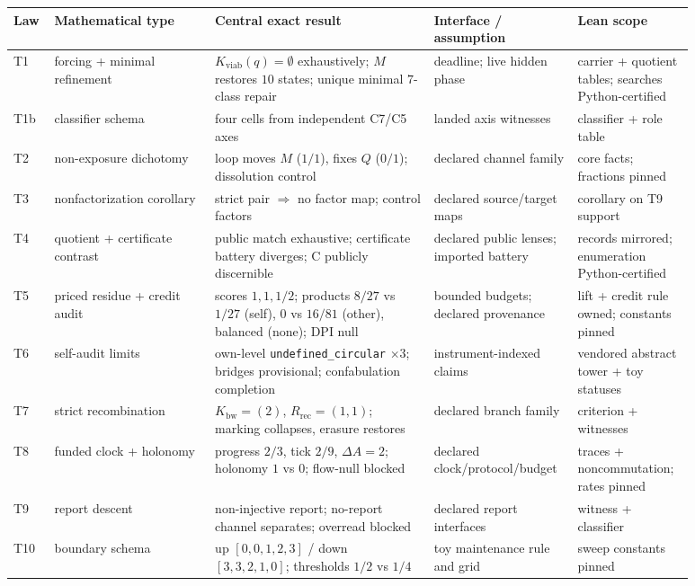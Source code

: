 \documentclass[11pt]{article}
\newcommand{\Kviab}{K_{\mathrm{viab}}}
\newcommand{\Kbw}{K_{\mathrm{bw}}}
\newcommand{\Rrec}{R_{\mathrm{rec}}}
\theoremstyle{definition}
\begin{document}
\begin{table}[p]
\centering\footnotesize
\begin{tabular}{p{0.05\linewidth}p{0.22\linewidth}p{0.3\linewidth}p{0.16\linewidth}p{0.15\linewidth}}
\toprule
Law & Mathematical type & Central exact result & Interface / assumption & Lean scope \\
\midrule
T1 & forcing + minimal refinement & $\Kviab(q)=\emptyset$ exhaustively; $M$ restores $10$ states; unique minimal $7$-class repair & deadline; live hidden phase & carrier + quotient tables; searches Python-certified \\
T1b & classifier schema & four cells from independent C7/C5 axes & landed axis witnesses & classifier + role table \\
T2 & non-exposure dichotomy & loop moves $M$ ($1/1$), fixes $Q$ ($0/1$); dissolution control & declared channel family & core facts; fractions pinned \\
T3 & nonfactorization corollary & strict pair $\Rightarrow$ no factor map; control factors & declared source/target maps & corollary on T9 support \\
T4 & quotient + certificate contrast & public match exhaustive; certificate battery diverges; C publicly discernible & declared public lenses; imported battery & records mirrored; enumeration Python-certified \\
T5 & priced residue + credit audit & scores $1,1,1/2$; products $8/27$ vs $1/27$ (self), $0$ vs $16/81$ (other), balanced (none); DPI null & bounded budgets; declared provenance & lift + credit rule owned; constants pinned \\
T6 & self-audit limits & own-level \texttt{undefined\_circular} $\times 3$; bridges provisional; confabulation completion & instrument-indexed claims & vendored abstract tower + toy statuses \\
T7 & strict recombination & $\Kbw{=}(2)$, $\Rrec{=}(1,1)$; marking collapses, erasure restores & declared branch family & criterion + witnesses \\
T8 & funded clock + holonomy & progress $2/3$, tick $2/9$, $\Delta A{=}2$; holonomy $1$ vs $0$; flow-null blocked & declared clock/protocol/budget & traces + noncommutation; rates pinned \\
T9 & report descent & non-injective report; no-report channel separates; overread blocked & declared report interfaces & witness + classifier \\
T10 & boundary schema & up $[0,0,1,2,3]$ / down $[3,3,2,1,0]$; thresholds $1/2$ vs $1/4$ & toy maintenance rule and grid & sweep constants pinned \\

\end{tabular}
\end{table}
\end{document}
